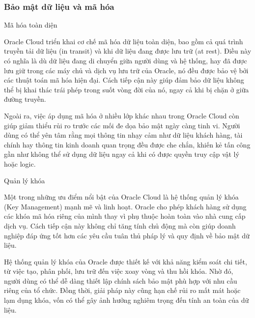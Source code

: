 \subsubsection{Bảo mật dữ liệu và mã hóa}
\begin{myitem}
    
\item Mã hóa toàn diện
\begin{mysubitem}
    \item Oracle Cloud triển khai cơ chế mã hóa dữ liệu toàn diện, bao gồm cả quá trình truyền tải dữ liệu (in transit) và khi dữ liệu đang được lưu trữ (at rest). Điều này có nghĩa là dù dữ liệu đang di chuyển giữa người dùng và hệ thống, hay đã được lưu giữ trong các máy chủ và dịch vụ lưu trữ của Oracle, nó đều được bảo vệ bởi các thuật toán mã hóa hiện đại. Cách tiếp cận này giúp đảm bảo dữ liệu không thể bị khai thác trái phép trong suốt vòng đời của nó, ngay cả khi bị chặn ở giữa đường truyền.

    \item Ngoài ra, việc áp dụng mã hóa ở nhiều lớp khác nhau trong Oracle Cloud còn giúp giảm thiểu rủi ro trước các mối đe dọa bảo mật ngày càng tinh vi. Người dùng có thể yên tâm rằng mọi thông tin nhạy cảm như dữ liệu khách hàng, tài chính hay thông tin kinh doanh quan trọng đều được che chắn, khiến kẻ tấn công gần như không thể sử dụng dữ liệu ngay cả khi có được quyền truy cập vật lý hoặc logic.
\end{mysubitem}


\item Quản lý khóa
\begin{mysubitem}
    \item Một trong những ưu điểm nổi bật của Oracle Cloud là hệ thống quản lý khóa (Key Management) mạnh mẽ và linh hoạt. Oracle cho phép khách hàng sử dụng các khóa mã hóa riêng của mình thay vì phụ thuộc hoàn toàn vào nhà cung cấp dịch vụ. Cách tiếp cận này không chỉ tăng tính chủ động mà còn giúp doanh nghiệp đáp ứng tốt hơn các yêu cầu tuân thủ pháp lý và quy định về bảo mật dữ liệu.

    \item Hệ thống quản lý khóa của Oracle được thiết kế với khả năng kiểm soát chi tiết, từ việc tạo, phân phối, lưu trữ đến việc xoay vòng và thu hồi khóa. Nhờ đó, người dùng có thể dễ dàng thiết lập chính sách bảo mật phù hợp với nhu cầu riêng của tổ chức. Đồng thời, giải pháp này cũng hạn chế rủi ro mất mát hoặc lạm dụng khóa, vốn có thể gây ảnh hưởng nghiêm trọng đến tính an toàn của dữ liệu.
\end{mysubitem}


\end{myitem}
